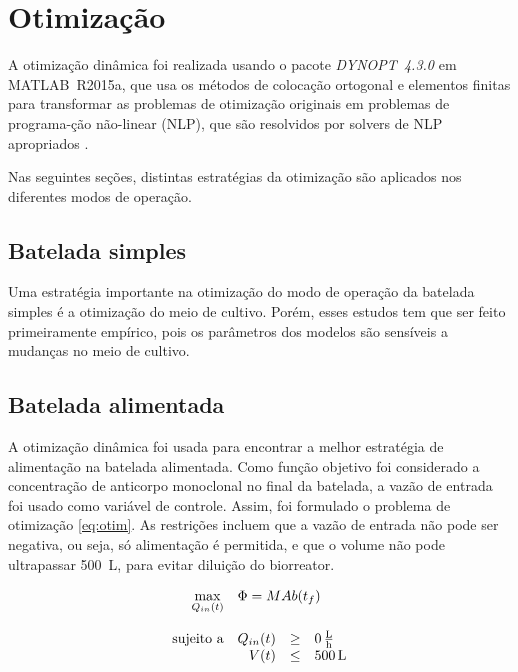 \documentclass[fleqn,10pt]{SelfArx} %
\begin{document}
\section{Otimização}

A otimização dinâmica foi realizada usando o pacote \textit{DYNOPT~4.3.0} em MATLAB~R2015a, que usa os métodos de colocação ortogonal e elementos finitas para transformar as problemas de otimização originais em problemas de programa-ção não-linear (NLP), que são resolvidos por solvers de NLP apropriados \cite{Cizniar2005}.

Nas seguintes seções, distintas estratégias da otimização são aplicados nos diferentes modos de operação. 

\subsection{Batelada simples}

Uma estratégia importante na otimização do modo de operação da batelada simples é a otimização do meio de cultivo. Porém, esses estudos tem que ser feito primeiramente empírico, pois os parâmetros dos modelos são sensíveis a mudanças no meio de cultivo.

\subsection{Batelada alimentada}

A otimização dinâmica foi usada para encontrar a melhor estratégia de alimentação na batelada alimentada. Como função objetivo foi considerado a concentração de anticorpo monoclonal no final da batelada, a vazão de entrada foi usado como variável de controle.
Assim, foi formulado o problema de otimização \ref{eq:otim}. As restrições incluem que a vazão de entrada não pode ser negativa, ou seja, só alimentação é permitida, e que o volume não pode ultrapassar \SI{500}{\liter}, para evitar diluição do biorreator.

\begin{equation} \label{eq:otim}
\begin{array}{rrclcl}
\displaystyle \max_{Q_{in}(t)} & \multicolumn{3}{l}{\Phi = MAb(t_f)} \\
& & & \\
\textrm{sujeito a} & Q_{in}(t) & \geq & \SI[per-mode=fraction]{0}{\liter\per\hour} \\
& V (t)& \leq & \SI{500}{\liter}\\
\end{array}
\end{equation}
\end{document}
